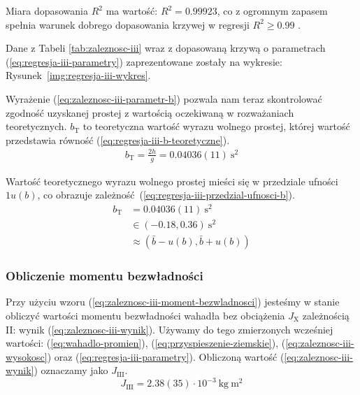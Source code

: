 \documentclass[twocolumn, a4paper, polish, 10pt]{article}
\newcommand{\JX}{\ensuremath{ J_{\mathrm{X}} }}
\newcommand{\JXn}[1]{\ensuremath{ J_{\mathrm{#1}} }}
\begin{document}
Miara dopasowania $R^2$ ma wartość: $R^2 = 0.99923$, co z ogromnym zapasem spełnia warunek dobrego dopasowania krzywej w regresji $R^2 \geq 0.99$ \cite{epa-8000d}.

Dane z Tabeli \ref{tab:zaleznosc-iii} wraz z dopasowaną krzywą o parametrach (\ref{eq:regresja-iii-parametry}) zaprezentowane zostały na wykresie: Rysunek~\ref{img:regresja-iii-wykres}.


Wyrażenie (\ref{eq:zaleznosc-iii-parametr-b}) pozwala nam teraz skontrolować zgodność uzyskanej prostej z wartością oczekiwaną w rozważaniach teoretycznych. $b_{\mathrm{T}}$ to teoretyczna wartość wyrazu wolnego prostej, której wartość przedstawia równość (\ref{eq:regresja-iii-b-teoretyczne}).
\begin{equation}
\begin{split}
    b_{\mathrm{T}} = \frac{2h}{g} = 0.04036(11)~\mathrm{s^2}
    \label{eq:regresja-iii-b-teoretyczne}
\end{split}
\end{equation}

Wartość teoretycznego wyrazu wolnego prostej mieści się w przedziale ufności $1u(b)$, co obrazuje zależność~(\ref{eq:regresja-iii-przedzial-ufnosci-b}).
\begin{equation}
\begin{split}
    b_{\mathrm{T}} &= 0.04036(11)~\mathrm{s^2} \\
    &\in \left( -0.18, 0.36 \right)~\mathrm{s^2} \\
    &\approx \left(
        \bar{b} - u(b),
        \bar{b} + u(b)
    \right)
    \label{eq:regresja-iii-przedzial-ufnosci-b}
\end{split}
\end{equation}

\subsubsection{Obliczenie momentu bezwładności}
Przy użyciu wzoru (\ref{eq:zaleznosc-iii-moment-bezwladnosci}) jesteśmy w stanie obliczyć wartości momentu bezwładności wahadła bez obciążenia $\JX$ zależnością II: wynik (\ref{eq:zaleznosc-iii-wynik}). Używamy do tego zmierzonych wcześniej wartości: (\ref{eq:wahadlo-promien}), (\ref{eq:przyspieszenie-ziemskie}), (\ref{eq:zaleznosc-iii-wysokosc}) oraz (\ref{eq:regresja-iii-parametry}). Obliczoną wartość (\ref{eq:zaleznosc-iii-wynik}) oznaczamy jako $\JXn{III}$.
\begin{equation}
    \JXn{III} = 2.38(35) \cdot 10^{-3}~\mathrm{kg~m^2}
    \label{eq:zaleznosc-iii-wynik}
\end{equation}
\end{document}
